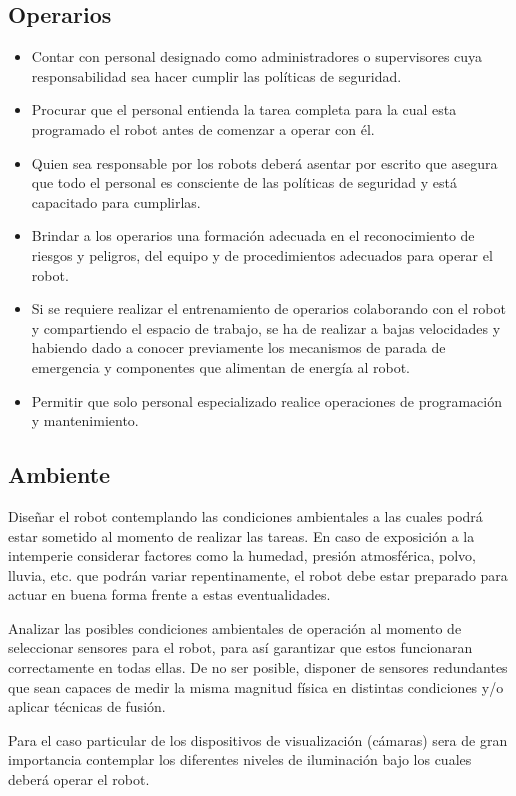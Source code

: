 \documentclass[withindex,glossary]{cam-thesis}
\begin{document}
\subsection{Operarios}
\begin{itemize}
  \item Contar con personal designado como administradores o supervisores cuya responsabilidad sea hacer cumplir las políticas de seguridad.
  \item Procurar que el personal entienda la tarea completa para la cual esta programado el robot antes de comenzar a operar con él. 
  \item Quien sea responsable por los robots deberá asentar por escrito que asegura que todo el personal es consciente de las políticas de seguridad y está capacitado para cumplirlas.
  \item Brindar a los operarios una formación adecuada en el reconocimiento de riesgos y peligros, del equipo y de procedimientos adecuados para operar el robot.
  \item Si se requiere realizar el entrenamiento de operarios colaborando con el robot y compartiendo el espacio de trabajo, se ha de realizar a bajas velocidades y habiendo dado a conocer previamente los mecanismos de parada de emergencia y componentes que alimentan de energía al robot.
  \item Permitir que solo personal especializado realice operaciones de programación y mantenimiento.
\end{itemize}

\subsection{Ambiente}
Diseñar el robot contemplando las condiciones ambientales a las cuales podrá estar sometido al momento de realizar las tareas. En caso de exposición a la intemperie considerar factores como la humedad, presión atmosférica, polvo, lluvia, etc. que podrán variar repentinamente, el robot debe estar preparado para actuar en buena forma frente a estas eventualidades.

Analizar las posibles condiciones ambientales de operación al momento de seleccionar sensores para el robot, para así garantizar que estos funcionaran correctamente en todas ellas. De no ser posible, disponer de sensores redundantes que sean capaces de medir la misma magnitud física en distintas condiciones y/o aplicar técnicas de fusión.

Para el caso particular de los dispositivos de visualización (cámaras) sera de gran importancia contemplar los diferentes niveles de iluminación bajo los cuales deberá operar el robot.
\end{document}
